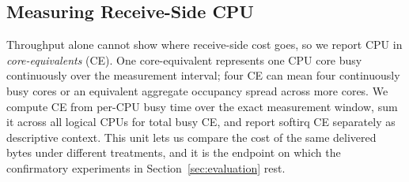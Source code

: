 \subsection{Measuring Receive-Side CPU}
\label{sec:background-ce}

Throughput alone cannot show where receive-side cost goes, so we report CPU in
\emph{core-equivalents} (CE). One core-equivalent represents one CPU core busy
continuously over the measurement interval; four CE can mean four continuously
busy cores or an equivalent aggregate occupancy spread across more cores. We
compute CE from per-CPU busy time over the exact measurement window, sum it
across all logical CPUs for total busy CE, and report softirq CE separately as
descriptive context. This unit lets us compare the cost of the same delivered
bytes under different treatments, and it is the endpoint on which the
confirmatory experiments in Section~\ref{sec:evaluation} rest.
